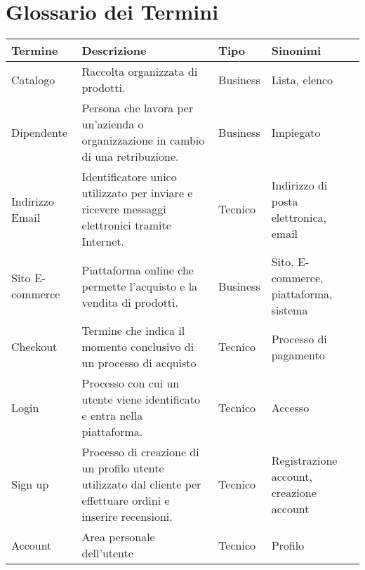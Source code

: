 \chapter{Glossario dei Termini}
\label{ch:GlossarioDeiTermini}

\begin{longtable}{|p{3.5cm}|p{6cm}|p{2.5cm}|p{4cm}|} 
 \hline
 \textbf{Termine} & \textbf{Descrizione} & \textbf{Tipo} & \textbf{Sinonimi} \\ [1ex] 
 \hline
  Catalogo & Raccolta organizzata di prodotti. & Business & Lista, elenco \\ [1ex] 
 \hline
 Dipendente & Persona che lavora per un'azienda o organizzazione in cambio di una retribuzione. & Business & Impiegato \\ [1ex] 
 \hline
 Indirizzo Email & Identificatore unico utilizzato per inviare e ricevere messaggi elettronici tramite Internet. & Tecnico & Indirizzo di posta elettronica, email \\ [1ex] 
 \hline
 Sito E-commerce & Piattaforma online che permette l'acquisto e la vendita di prodotti. & Business & Sito, E-commerce, piattaforma, sistema \\ [1ex] 
 \hline
 Checkout & Termine che indica il momento conclusivo di un processo di acquisto & Tecnico & Processo di pagamento \\ [1ex] 
 \hline
 Login & Processo con cui un utente viene identificato e entra nella piattaforma. & Tecnico & Accesso \\ [1ex] 
 \hline
 Sign up & Processo di creazione di un profilo utente utilizzato dal cliente per effettuare ordini e inserire recensioni. & Tecnico & Registrazione account, creazione account \\ [1ex] 
 \hline
 Account & Area personale dell'utente & Tecnico & Profilo \\ [1ex] 
 \hline
\end{longtable}
